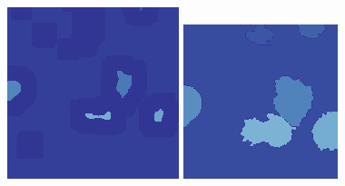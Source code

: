 \begin{figure}[t!]
	\includegraphics[width=0.97\linewidth]{Figures/Chapter2/6b2.png}	
	\includegraphics[width=0.97\linewidth]{Figures/Chapter2/6c2.png}
	\endminipage\hfill
	\centering	

\end{figure}
